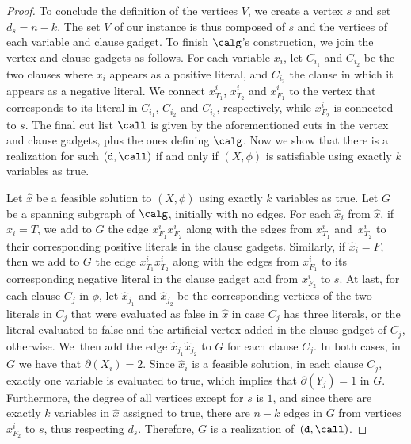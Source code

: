 \begin{proof}
    To conclude the definition of the vertices $V$,
    we create a vertex $s$ and set $d_s = n - k$.
    The set $V$ of our instance is thus composed of $s$ and the vertices of each variable and clause gadget.
    To finish $\calg$'s construction, we join the vertex and clause gadgets as follows.
    For each variable $x_i$, let $C_{i_1}$ and $C_{i_2}$ be the two clauses where $x_i$ appears as a positive literal, and $C_{i_3}$ the clause in which it appears as a negative literal.
    We connect $x^i_{T_1}$, $x^i_{T_2}$ and $x^i_{F_1}$ to the vertex that corresponds to its literal in $C_{i_1}$, $C_{i_2}$ and $C_{i_3}$, respectively, while $x^i_{F_2}$ is connected to $s$.
    The final cut list $\call$ is given by the aforementioned cuts in the vertex and clause gadgets, plus the ones defining $\calg$.
    Now we show that there is a realization for such $(\texttt{d}, \call)$ if and only if $(X, \phi)$ is satisfiable using exactly $k$ variables as true.

    Let $\hat{x}$ be a feasible solution to $(X, \phi)$ using exactly $k$ variables as true.
    Let $G$ be a spanning subgraph of $\calg$, initially with no edges.
    For each $\hat{x}_i$ from $\hat{x}$, if $\hat{x}_i = T$, we add to $G$ the edge $x^i_{F_1}x^i_{F_2}$ along with the edges from $x^i_{T_1}$ and~$x^i_{T_2}$ to their corresponding positive literals in the clause gadgets.
    Similarly, if $\hat{x}_i = F$, then we add to $G$ the edge $x^i_{T_1}x^i_{T_2}$ along with the edges from $x^i_{F_1}$ to its corresponding negative literal in the clause gadget and from $x^i_{F_2}$ to $s$.
    At last, for each clause $C_j$ in $\phi$, let $\hat{x}_{j_1}$ and $\hat{x}_{j_2}$ be the corresponding vertices of the two literals in $C_j$ that were evaluated as false in $\hat{x}$ in case $C_j$ has three literals, or the literal evaluated to false and the artificial vertex added in the clause gadget of $C_j$, otherwise. We~then add the edge $\hat{x}_{j_1}\hat{x}_{j_2}$ to $G$ for each clause $C_j$.
    In both cases, in $G$ we have that $\partial(X_i) = 2$. 
    Since $\hat{x}_i$ is a feasible solution, in each clause $C_j$, exactly one variable is evaluated to true, which implies that $\partial(Y_j) = 1$ in $G$.
    Furthermore, the degree of all vertices except for $s$ is $1$, and since there are exactly $k$ variables in $\hat{x}$ assigned to true, there are $n-k$ edges in $G$ from vertices $x^i_{F_2}$ to $s$, thus respecting $d_s$. Therefore, $G$ is a realization of~$(\texttt{d}, \call)$.


\end{proof}

